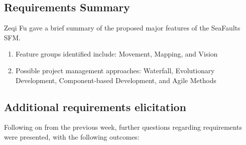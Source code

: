 \documentclass[11pt, a4paper]{article}
\begin{document}
\subsection{Requirements Summary }
Zeqi Fu gave a brief summary of the proposed major features of the SeaFaults SFM. 

\begin{enumerate}
\item Feature groups identified include: Movement, Mapping, and Vision
\item Possible project management approaches: Waterfall, Evolutionary Development, Component-based Development, and Agile Methods
\end{enumerate}

\subsection{Additional requirements elicitation}
Following on from the previous week, further questions regarding requirements were presented, with the following outcomes:
\end{document}
